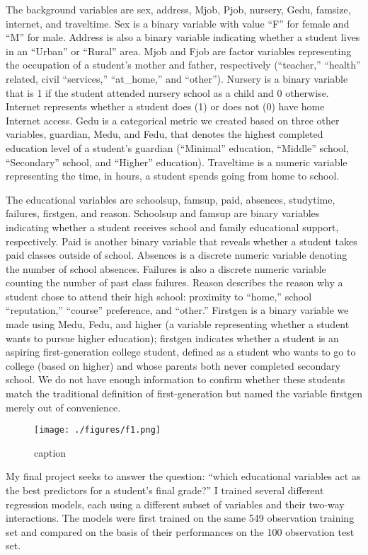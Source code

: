 \documentclass[
]{article}
\begin{document}
The background variables are sex, address, Mjob, Pjob, nursery, Gedu,
famsize, internet, and traveltime. Sex is a binary variable with value
``F'' for female and ``M'' for male. Address is also a binary variable
indicating whether a student lives in an ``Urban'' or ``Rural'' area.
Mjob and Fjob are factor variables representing the occupation of a
student's mother and father, respectively (``teacher,'' ``health''
related, civil ``services,'' ``at\_home,'' and ``other''). Nursery is a
binary variable that is 1 if the student attended nursery school as a
child and 0 otherwise. Internet represents whether a student does (1) or
does not (0) have home Internet access. Gedu is a categorical metric we
created based on three other variables, guardian, Medu, and Fedu, that
denotes the highest completed education level of a student's guardian
(``Minimal'' education, ``Middle'' school, ``Secondary'' school, and
``Higher'' education). Traveltime is a numeric variable representing the
time, in hours, a student spends going from home to school.

The educational variables are schoolsup, famsup, paid, absences,
studytime, failures, firstgen, and reason. Schoolsup and famsup are
binary variables indicating whether a student receives school and family
educational support, respectively. Paid is another binary variable that
reveals whether a student takes paid classes outside of school. Absences
is a discrete numeric variable denoting the number of school absences.
Failures is also a discrete numeric variable counting the number of past
class failures. Reason describes the reason why a student chose to
attend their high school: proximity to ``home,'' school ``reputation,''
``course'' preference, and ``other.'' Firstgen is a binary variable we
made using Medu, Fedu, and higher (a variable representing whether a
student wants to pursue higher education); firstgen indicates whether a
student is an aspiring first-generation college student, defined as a
student who wants to go to college (based on higher) and whose parents
both never completed secondary school. We do not have enough information
to confirm whether these students match the traditional definition of
first-generation but named the variable firstgen merely out of
convenience.

\begin{figure}
\centering
\texttt{[image: ./figures/f1.png]}
\caption{caption}
\end{figure}

My final project seeks to answer the question: ``which educational
variables act as the best predictors for a student's final grade?'' I
trained several different regression models, each using a different
subset of variables and their two-way interactions. The models were
first trained on the same 549 observation training set and compared on
the basis of their performances on the 100 observation test set.
\end{document}
